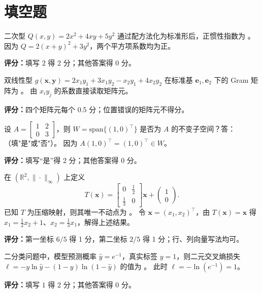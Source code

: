 \documentclass[10pt,a4paper]{exam-zh}
\newcommand{\bvec}[1]{\boldsymbol{#1}}
\newcommand{\Span}{\mathrm{span}}
\newcommand{\R}{\mathbb{R}}
\newcommand{\shortgrading}[1]{%
  \par\smallskip\noindent\textcolor{gradingred}{\textbf{评分：}}#1\par}
\begin{document}
\section{填空题}

\begin{question}
  二次型 $Q(x, y) = 2x^2 + 4xy + 5y^2$ 通过配方法化为标准形后，正惯性指数为 \fillin[2] 。
  因为 $Q=2(x+y)^2+3y^2$，两个平方项系数均为正。
  \shortgrading{填写 $2$ 得 2 分；其他答案得 0 分。}
\end{question}

\begin{question}
  双线性型 $g(\bvec{x}, \bvec{y}) = 2x_1y_1 + 3x_1y_2 - x_2y_1 + 4x_2y_2$ 在标准基 $\bvec{e}_1, \bvec{e}_2$ 下的 Gram 矩阵为 \fillin[{$\begin{bmatrix} 2 & 3 \\ -1 & 4 \end{bmatrix}$}] 。
  由 $x_i y_j$ 的系数直接读取矩阵元。
  \shortgrading{四个矩阵元每个 0.5 分；位置错误的矩阵元不得分。}
\end{question}

\begin{question}
  设 $A = \begin{bmatrix} 1 & 2 \\ 0 & 3 \end{bmatrix}$，则 $W = \Span\{(1, 0)^\top\}$ 是否为 $A$ 的不变子空间？答：\fillin[是] （填"是"或"否"）。
  因为 $A(1,0)^\top=(1,0)^\top\in W$。
  \shortgrading{填写“是”得 2 分；其他答案得 0 分。}
\end{question}

\begin{question}
  在 $(\R^2,\|\cdot\|_\infty)$ 上定义
  \[
  T(\bvec{x})=
  \begin{bmatrix}0&\frac12\\[1mm]\frac13&0\end{bmatrix}\bvec{x}
  +\begin{pmatrix}1\\0\end{pmatrix}.
  \]
  已知 $T$ 为压缩映射，则其唯一不动点为
   。
  令 $\bvec x=(x_1,x_2)^\top$，由 $T(\bvec x)=\bvec x$ 得
  $x_1=\frac12x_2+1$、$x_2=\frac13x_1$，解得上述结果。
  \shortgrading{第一坐标 $6/5$ 得 1 分，第二坐标 $2/5$ 得 1 分；行、列向量写法均可。}
\end{question}

\begin{question}
  二分类问题中，模型预测概率 $\hat{y} = e^{-1}$，真实标签 $y = 1$，则二元交叉熵损失 $\ell = -y\ln\hat{y} - (1-y)\ln(1-\hat{y})$ 的值为 \fillin[1] 。
  此时 $\ell=-\ln(e^{-1})=1$。
  \shortgrading{填写 $1$ 得 2 分；其他答案得 0 分。}
\end{question}
\end{document}
